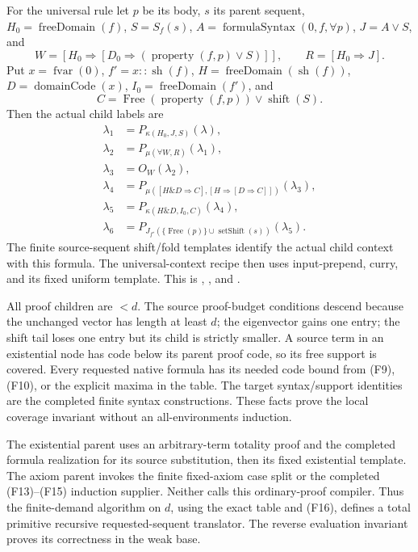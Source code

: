 For the universal rule let $p$ be its body, $s$ its parent sequent,
$H_0=\operatorname{freeDomain}(f)$, $S=S_f(s)$,
$A=\operatorname{formulaSyntax}(0,f,\forall p)$,
$J=A\lor S$, and
\[
 W=[H_0\Rightarrow[D_0\Rightarrow
          (\operatorname{property}(f,p)\lor S)]],\qquad
 R=[H_0\Rightarrow J].
\]
Put $x=\operatorname{fvar}(0)$, $f'=x::\operatorname{sh}(f)$,
$H=\operatorname{freeDomain}(\operatorname{sh}(f))$,
$D=\operatorname{domainCode}(x)$,
$I_0=\operatorname{freeDomain}(f')$, and
\[
 C=\operatorname{Free}(\operatorname{property}(f,p))
                   \lor\operatorname{shift}(S).
\]
Then the actual child labels are
\begin{align*}
 \lambda_1&=P_{\kappa(H_0,J,S)}(\lambda),\\
 \lambda_2&=P_{\mu(\forall W,R)}(\lambda_1),\\
 \lambda_3&=O_W(\lambda_2),\\
 \lambda_4&=P_{\mu([H\mathbin\&D\Rightarrow C],
                       [H\Rightarrow[D\Rightarrow C]])}(\lambda_3),\\
 \lambda_5&=P_{\kappa(H\mathbin\&D,I_0,C)}(\lambda_4),\\
 \lambda_6&=P_{J_{f'}(\{\operatorname{Free}(p)\}\cup
                          \operatorname{setShift}(s))}(\lambda_5).
 \tag{F16}
\end{align*}
The finite source-sequent shift/fold templates identify the actual
child context with this formula.  The universal-context recipe then
uses input-prepend, curry, and its fixed uniform template.  This is
,
, and
.

All proof children are $<d$.  The source proof-budget conditions
descend because the unchanged vector has length at least $d$;
the eigenvector gains one entry; the shift tail loses one entry
but its child is strictly smaller.  A source term in an existential
node has code below its parent proof code, so its free support is
covered.  Every requested native formula has its needed code bound
from (F9), (F10), or the explicit maxima in the table.  The target
syntax/support identities are the completed finite syntax
constructions.  These facts prove the local coverage invariant
without an all-environments induction.

The existential parent uses an arbitrary-term totality proof and
the completed formula realization for its source substitution,
then its fixed existential template.  The axiom parent invokes the
finite fixed-axiom case split or the completed (F13)--(F15) induction
supplier.  Neither calls this ordinary-proof compiler.  Thus the
finite-demand algorithm on $d$, using the exact table and (F16),
defines a total primitive recursive requested-sequent translator.
The reverse evaluation invariant proves its correctness in the
weak base.

